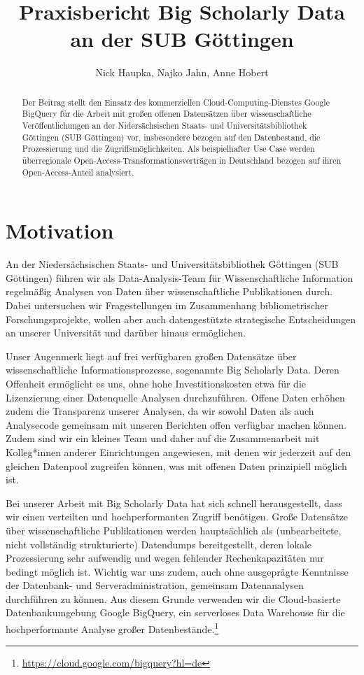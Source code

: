 \documentclass[a4paper,
fontsize=11pt,
oneside,
numbers=noperiodatend,
parskip=half-,
bibliography=totoc,
final
]{scrartcl}
\title{\LARGE{Praxisbericht Big Scholarly Data an der SUB Göttingen}}%
\author{Nick Haupka, Najko Jahn, Anne Hobert} %
\date{}
\begin{document}
\maketitle
\thispagestyle{fancyplain} 

\begin{abstract}
\noindent
Der Beitrag stellt den Einsatz des kommerziellen
Cloud-Computing-Dienstes Google BigQuery für die Arbeit mit großen
offenen Datensätzen über wissenschaftliche Veröffentlichungen an der
Nidersächsischen Staats- und Universitätsbibliothek Göttingen (SUB
Göttingen) vor, insbesondere bezogen auf den Datenbestand, die
Prozessierung und die Zugriffsmöglichkeiten. Als beispielhafter Use Case
werden überregionale Open-Access-Transformationsverträgen in Deutschland
bezogen auf ihren Open-Access-Anteil analysiert.
\end{abstract}

\hypertarget{motivation}{%
\section{Motivation}\label{motivation}}

An der Niedersächsischen Staats- und Universitätsbibliothek Göttingen
(SUB Göttingen) führen wir als Data-Analysis-Team für Wissenschaftliche
Information regelmäßig Analysen von Daten über wissenschaftliche
Publikationen durch. Dabei untersuchen wir Fragestellungen im
Zusammenhang bibliometrischer Forschungsprojekte, wollen aber auch
datengestützte strategische Entscheidungen an unserer Universität und
darüber hinaus ermöglichen.

Unser Augenmerk liegt auf frei verfügbaren großen Datensätze über
wissenschaftliche Informationsprozesse, sogenannte Big Scholarly Data.
Deren Offenheit ermöglicht es uns, ohne hohe Investitionskosten etwa für
die Lizenzierung einer Datenquelle Analysen durchzuführen. Offene Daten
erhöhen zudem die Transparenz unserer Analysen, da wir sowohl Daten als
auch Analysecode gemeinsam mit unseren Berichten offen verfügbar machen
können. Zudem sind wir ein kleines Team und daher auf die Zusammenarbeit
mit Kolleg*innen anderer Einrichtungen angewiesen, mit denen wir
jederzeit auf den gleichen Datenpool zugreifen können, was mit offenen
Daten prinzipiell möglich ist.

Bei unserer Arbeit mit Big Scholarly Data hat sich schnell
herausgestellt, dass wir einen verteilten und hochperformanten Zugriff
benötigen. Große Datensätze über wissenschaftliche Publikationen werden
hauptsächlich als (unbearbeitete, nicht vollständig strukturierte)
Datendumps bereitgestellt, deren lokale Prozessierung sehr aufwendig und
wegen fehlender Rechenkapazitäten nur bedingt möglich ist. Wichtig war
uns zudem, auch ohne ausgeprägte Kenntnisse der Datenbank- und
Serveradministration, gemeinsam Datenanalysen durchführen zu können. Aus
diesem Grunde verwenden wir die Cloud-basierte Datenbankumgebung Google
BigQuery, ein serverloses Data Warehouse für die hochperformante Analyse
großer Datenbestände.\footnote{\url{https://cloud.google.com/bigquery?hl=de}}
\end{document}

